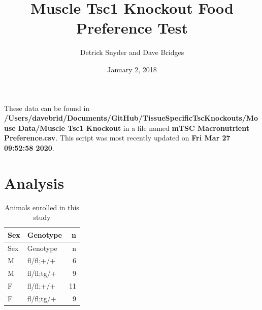 \documentclass[]{article}
\title{Muscle Tsc1 Knockout Food Preference Test}
\author{Detrick Snyder and Dave Bridges}
\date{January 2, 2018}
\begin{document}
\maketitle

{
\setcounter{tocdepth}{2}
\tableofcontents
}
These data can be found in
\textbf{/Users/davebrid/Documents/GitHub/TissueSpecificTscKnockouts/Mouse
Data/Muscle Tsc1 Knockout} in a file named \textbf{mTSC Macronutrient
Preference.csv}. This script was most recently updated on \textbf{Fri
Mar 27 09:52:58 2020}.

\hypertarget{analysis}{%
\section{Analysis}\label{analysis}}

\begin{longtable}[]{@{}llr@{}}
\caption{Animals enrolled in this study}\tabularnewline
\toprule
Sex & Genotype & n\tabularnewline
\midrule
\endfirsthead
\toprule
Sex & Genotype & n\tabularnewline
\midrule
\endhead
M & fl/fl;+/+ & 6\tabularnewline
M & fl/fl;tg/+ & 9\tabularnewline
F & fl/fl;+/+ & 11\tabularnewline
F & fl/fl;tg/+ & 9\tabularnewline
\bottomrule
\end{longtable}
\end{document}

